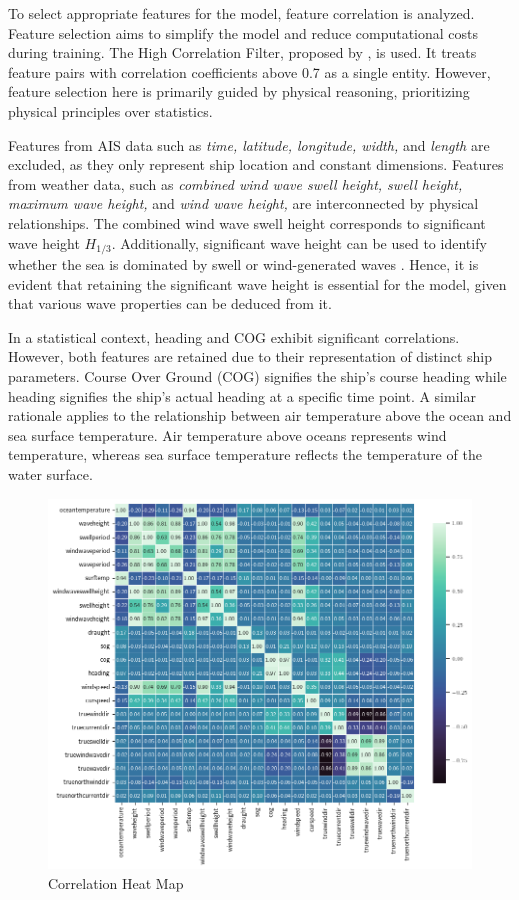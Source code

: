 \documentclass[]{interact}
\theoremstyle{plain}%
\theoremstyle{definition}
\theoremstyle{remark}
\begin{document}
To select appropriate features for the model, feature correlation is analyzed. Feature selection aims to simplify the model and reduce computational costs during training. The High Correlation Filter, proposed by \citet{Abebe.2020}, is used. It treats feature pairs with correlation coefficients above 0.7 as a single entity. However, feature selection here is primarily guided by physical reasoning, prioritizing physical principles over statistics.

Features from AIS data such as \emph{time, latitude, longitude, width,} and \emph{length} are excluded, as they only represent ship location and constant dimensions. Features from weather data, such as \emph{combined wind wave swell height, swell height, maximum wave height,} and \emph{wind wave height,} are interconnected by physical relationships. The combined wind wave swell height corresponds to significant wave height $H_{1/3}$. Additionally, significant wave height can be used to identify whether the sea is dominated by swell or wind-generated waves \citep{BitnerGregersen.2005}. Hence, it is evident that retaining the significant wave height is essential for the model, given that various wave properties can be deduced from it. 

In a statistical context, heading and COG exhibit significant correlations. However, both features are retained due to their representation of distinct ship parameters. Course Over Ground (COG) signifies the ship's course heading while heading signifies the ship's actual heading at a specific time point. A similar rationale applies to the relationship between air temperature above the ocean and sea surface temperature. Air temperature above oceans represents wind temperature, whereas sea surface temperature reflects the temperature of the water surface.

\begin{figure}[h!]
  \centering
  \includegraphics[width=.8\linewidth,height=.8\textheight,keepaspectratio]{00_figures/heatmap_corr_ovr.png}
  \caption{Correlation Heat Map}
  \label{fig:heatmap_ovr}
\end{figure}
\end{document}
